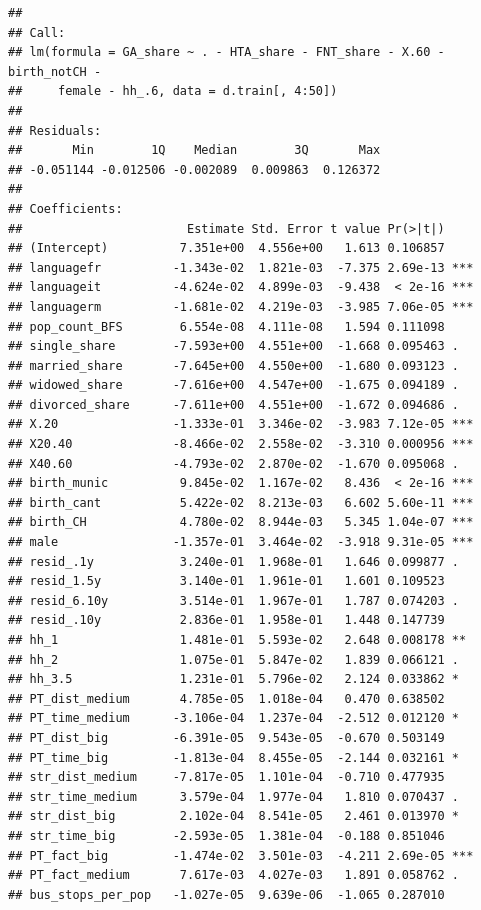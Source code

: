 \documentclass[
]{article}
\begin{document}
\begin{verbatim}
## 
## Call:
## lm(formula = GA_share ~ . - HTA_share - FNT_share - X.60 - birth_notCH - 
##     female - hh_.6, data = d.train[, 4:50])
## 
## Residuals:
##       Min        1Q    Median        3Q       Max 
## -0.051144 -0.012506 -0.002089  0.009863  0.126372 
## 
## Coefficients:
##                       Estimate Std. Error t value Pr(>|t|)    
## (Intercept)          7.351e+00  4.556e+00   1.613 0.106857    
## languagefr          -1.343e-02  1.821e-03  -7.375 2.69e-13 ***
## languageit          -4.624e-02  4.899e-03  -9.438  < 2e-16 ***
## languagerm          -1.681e-02  4.219e-03  -3.985 7.06e-05 ***
## pop_count_BFS        6.554e-08  4.111e-08   1.594 0.111098    
## single_share        -7.593e+00  4.551e+00  -1.668 0.095463 .  
## married_share       -7.645e+00  4.550e+00  -1.680 0.093123 .  
## widowed_share       -7.616e+00  4.547e+00  -1.675 0.094189 .  
## divorced_share      -7.611e+00  4.551e+00  -1.672 0.094686 .  
## X.20                -1.333e-01  3.346e-02  -3.983 7.12e-05 ***
## X20.40              -8.466e-02  2.558e-02  -3.310 0.000956 ***
## X40.60              -4.793e-02  2.870e-02  -1.670 0.095068 .  
## birth_munic          9.845e-02  1.167e-02   8.436  < 2e-16 ***
## birth_cant           5.422e-02  8.213e-03   6.602 5.60e-11 ***
## birth_CH             4.780e-02  8.944e-03   5.345 1.04e-07 ***
## male                -1.357e-01  3.464e-02  -3.918 9.31e-05 ***
## resid_.1y            3.240e-01  1.968e-01   1.646 0.099877 .  
## resid_1.5y           3.140e-01  1.961e-01   1.601 0.109523    
## resid_6.10y          3.514e-01  1.967e-01   1.787 0.074203 .  
## resid_.10y           2.836e-01  1.958e-01   1.448 0.147739    
## hh_1                 1.481e-01  5.593e-02   2.648 0.008178 ** 
## hh_2                 1.075e-01  5.847e-02   1.839 0.066121 .  
## hh_3.5               1.231e-01  5.796e-02   2.124 0.033862 *  
## PT_dist_medium       4.785e-05  1.018e-04   0.470 0.638502    
## PT_time_medium      -3.106e-04  1.237e-04  -2.512 0.012120 *  
## PT_dist_big         -6.391e-05  9.543e-05  -0.670 0.503149    
## PT_time_big         -1.813e-04  8.455e-05  -2.144 0.032161 *  
## str_dist_medium     -7.817e-05  1.101e-04  -0.710 0.477935    
## str_time_medium      3.579e-04  1.977e-04   1.810 0.070437 .  
## str_dist_big         2.102e-04  8.541e-05   2.461 0.013970 *  
## str_time_big        -2.593e-05  1.381e-04  -0.188 0.851046    
## PT_fact_big         -1.474e-02  3.501e-03  -4.211 2.69e-05 ***
## PT_fact_medium       7.617e-03  4.027e-03   1.891 0.058762 .  
## bus_stops_per_pop   -1.027e-05  9.639e-06  -1.065 0.287010    

\end{verbatim}
\end{document}
